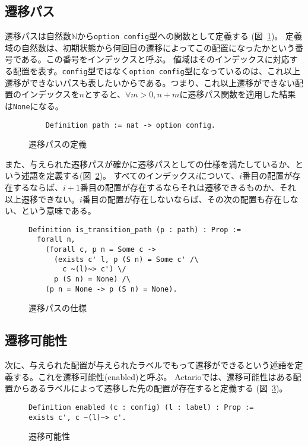 \subsection{遷移パス}
遷移パスは自然数$\mathbb{N}$から\texttt{option config}型への関数として定義する (図~\ref{code:formalization:path})。
定義域の自然数は、初期状態から何回目の遷移によってこの配置になったかという番号である。この番号をインデックスと呼ぶ。
値域はそのインデックスに対応する配置を表す。\texttt{config}型ではなく\texttt{option config}型になっているのは、これ以上遷移ができないパスも表したいからである。つまり、これ以上遷移ができない配置のインデックスを$n$とすると、$\forall m > 0, n + m$に遷移パス関数を適用した結果は\texttt{None}になる。

\begin{figure}[tp]
  \begin{lstlisting}
    Definition path := nat -> option config.
  \end{lstlisting}
  \label{code:formalization:path}
  \caption{遷移パスの定義}
\end{figure}

また、与えられた遷移パスが確かに遷移パスとしての仕様を満たしているか、という述語を定義する(図~\ref{code:formalization:path-spec})。
すべてのインデックス$i$について、$i$番目の配置が存在するならば、$i+1$番目の配置が存在するならそれは遷移できるものか、それ以上遷移できない。$i$番目の配置が存在しないならば、その次の配置も存在しない、という意味である。

\begin{figure}[tp]
  \begin{lstlisting}
Definition is_transition_path (p : path) : Prop :=
  forall n,
    (forall c, p n = Some c ->
      (exists c' l, p (S n) = Some c' /\
        c ~(l)~> c') \/
      p (S n) = None) /\
    (p n = None -> p (S n) = None).
  \end{lstlisting}
  \label{code:formalization:path-spec}
  \caption{遷移パスの仕様}
\end{figure}

\subsection{遷移可能性}
次に、与えられた配置が与えられたラベルでもって遷移ができるという述語を定義する。これを遷移可能性(enabled)と呼ぶ。
Actarioでは、遷移可能性はある配置からあるラベルによって遷移した先の配置が存在すると定義する (図~\ref{code:formalization:enabled})。

\begin{figure}[tp]
  \begin{lstlisting}
Definition enabled (c : config) (l : label) : Prop := exists c', c ~(l)~> c'.
  \end{lstlisting}
  \label{code:formalization:enabled}
  \caption{遷移可能性}
\end{figure}

